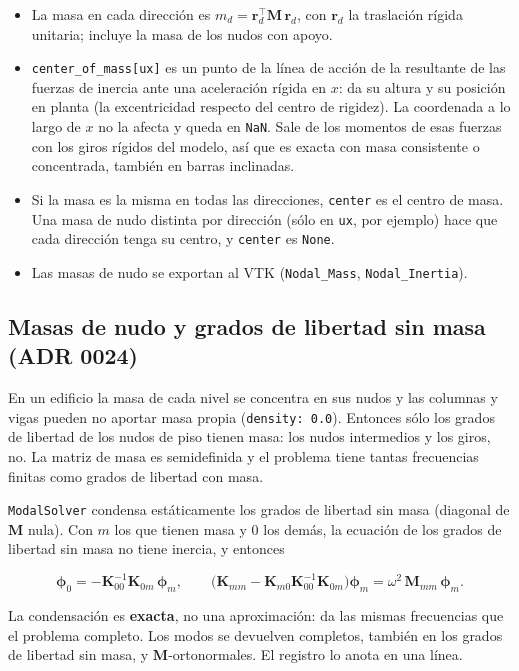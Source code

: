 \documentclass[11pt,oneside]{report}
\begin{document}
\begin{itemize}
  \item La masa en cada dirección es $m_d = \mathbf r_d^\top\mathbf M\,\mathbf r_d$, con $\mathbf r_d$ la traslación rígida unitaria; incluye la masa de los nudos con apoyo.
  \item \texttt{center\_\allowbreak{}of\_\allowbreak{}mass[\textquotedbl{}ux\textquotedbl{}]} es un punto de la línea de acción de la resultante de las fuerzas de inercia ante una aceleración rígida en $x$: da su altura y su posición en planta (la excentricidad respecto del centro de rigidez). La coordenada a lo largo de $x$ no la afecta y queda en \texttt{NaN}. Sale de los momentos de esas fuerzas con los giros rígidos del modelo, así que es exacta con masa consistente o concentrada, también en barras inclinadas.
  \item Si la masa es la misma en todas las direcciones, \texttt{center} es el centro de masa. Una masa de nudo distinta por dirección (sólo en \texttt{ux}, por ejemplo) hace que cada dirección tenga su centro, y \texttt{center} es \texttt{None}.
  \item Las masas de nudo se exportan al VTK (\texttt{Nodal\_Mass}, \texttt{Nodal\_Inertia}).
\end{itemize}

\subsection{Masas de nudo y grados de libertad sin masa (ADR 0024)}

En un edificio la masa de cada nivel se concentra en sus nudos y las columnas y vigas pueden no aportar masa propia (\texttt{density: 0.0}). Entonces sólo los grados de libertad de los nudos de piso tienen masa: los nudos intermedios y los giros, no. La matriz de masa es semidefinida y el problema tiene tantas frecuencias finitas como grados de libertad con masa.

\texttt{ModalSolver} condensa estáticamente los grados de libertad sin masa (diagonal de $\mathbf M$ nula). Con $m$ los que tienen masa y $0$ los demás, la ecuación de los grados de libertad sin masa no tiene inercia, y entonces

\[
\boldsymbol\phi_0 = -\mathbf K_{00}^{-1}\mathbf K_{0m}\,\boldsymbol\phi_m, \qquad \bigl(\mathbf K_{mm} - \mathbf K_{m0}\mathbf K_{00}^{-1}\mathbf K_{0m}\bigr)\boldsymbol\phi_m = \omega^2\,\mathbf M_{mm}\,\boldsymbol\phi_m .
\]

La condensación es \textbf{exacta}, no una aproximación: da las mismas frecuencias que el problema completo. Los modos se devuelven completos, también en los grados de libertad sin masa, y $\mathbf M$-ortonormales. El registro lo anota en una línea.
\end{document}
